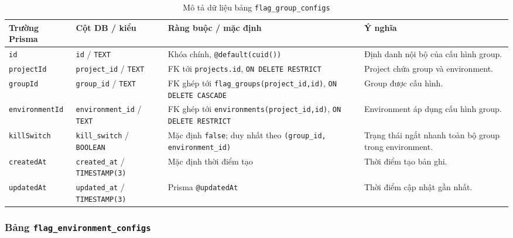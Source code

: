 \begin{table}[H]
    \centering
    \caption{Mô tả dữ liệu bảng \texttt{flag\_group\_configs}}
    \label{tab:db-flag-group-configs}
    \begingroup
    \singlespacing
    \scriptsize
    \setlength{\tabcolsep}{3pt}
    \renewcommand{\arraystretch}{1.12}
    \begin{tabular}{p{} p{} p{} p{}}
        \toprule
        \textbf{Trường Prisma} & \textbf{Cột DB / kiểu} & \textbf{Ràng buộc / mặc định} & \textbf{Ý nghĩa} \\
        \midrule
        \texttt{id} & \texttt{id} / \texttt{TEXT} & Khóa chính, \texttt{@default(cuid())} & Định danh nội bộ của cấu hình group. \\
        \texttt{projectId} & \texttt{project\_id} / \texttt{TEXT} & FK tới \texttt{projects.id}, \texttt{ON DELETE RESTRICT} & Project chứa group và environment. \\
        \texttt{groupId} & \texttt{group\_id} / \texttt{TEXT} & FK ghép tới \texttt{flag\_groups(project\_id,id)}, \texttt{ON DELETE CASCADE} & Group được cấu hình. \\
        \texttt{environmentId} & \texttt{environment\_id} / \texttt{TEXT} & FK ghép tới \texttt{environments(project\_id,id)}, \texttt{ON DELETE RESTRICT} & Environment áp dụng cấu hình group. \\
        \texttt{killSwitch} & \texttt{kill\_switch} / \texttt{BOOLEAN} & Mặc định \texttt{false}; duy nhất theo \texttt{(group\_id, environment\_id)} & Trạng thái ngắt nhanh toàn bộ group trong environment. \\
        \texttt{createdAt} & \texttt{created\_at} / \texttt{TIMESTAMP(3)} & Mặc định thời điểm tạo & Thời điểm tạo bản ghi. \\
        \texttt{updatedAt} & \texttt{updated\_at} / \texttt{TIMESTAMP(3)} & Prisma \texttt{@updatedAt} & Thời điểm cập nhật gần nhất. \\
        \bottomrule
    \end{tabular}
    \endgroup
\end{table}

\subsubsection{Bảng \texttt{flag\_environment\_configs}}

